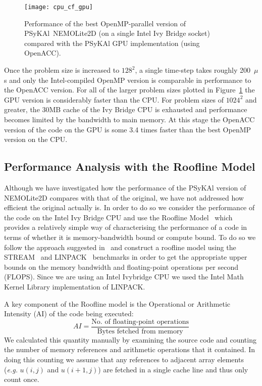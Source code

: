 \documentclass[gmd, manuscript]{copernicus}
\begin{document}
\begin{figure}
\centering
\texttt{[image: cpu\_cf\_gpu]}
\caption{Performance of the best OpenMP-parallel version of {PS}y{KA}l\
  NEMOLite2D (on a single Intel Ivy Bridge socket) compared with the {PS}y{KA}l GPU implementation (using OpenACC).}
\label{FIG_cpu_cf_gpu}
\end{figure}

Once the problem size is increased to $128^2$, a single time-step
takes roughly 200~$\mu$s and only the Intel-compiled OpenMP version is
comparable in performance to the OpenACC version. For all of the
larger problem sizes plotted in Figure~\ref{FIG_cpu_cf_gpu} the GPU
version is considerably faster than the CPU.  For problem sizes of
$1024^2$ and greater, the 30MB cache of the Ivy Bridge CPU is
exhausted and performance becomes limited by the bandwidth to main
memory. At this stage the OpenACC version of the code on the GPU is
some 3.4 times faster than the best OpenMP version on the CPU.


\subsection{Performance Analysis with the Roofline Model}

Although we have investigated how the performance of the {PS}y{KA}l
version of NEMOLite2D compares with that of the original, we have not
addressed how efficient the original actually is. In order to do so we
consider the performance of the code on the Intel Ivy Bridge CPU and
use the Roofline Model~\citep{roofline} which provides a relatively
simple way of characterising the performance of a code in terms of
whether it is memory-bandwidth bound or compute bound. To do so we
follow the approach suggested in~\cite{para_pearls} and construct a
roofline model using the STREAM~\citep{stream} and
LINPACK~\citep{linpack} benchmarks in order to get the appropriate
upper bounds on the memory bandwidth and floating-point operations per
second (FLOPS). Since we are using an Intel Ivybridge CPU we used the
Intel Math Kernel Library implementation of LINPACK.

A key component of the Roofline model is the Operational or Arithmetic
Intensity (AI) of the code being executed:
\[
AI = \frac{\textrm{No. of floating-point operations}}{\textrm{Bytes fetched from memory}}
\]
We calculated this quantity manually by examining the
source code and counting the number of memory references and
arithmetic operations that it contained. In doing this counting we
assume that any references to adjacent array elements (\textit{e.g.}
$u(i,j)$ and $u(i+1,j)$) are fetched in a single cache line and thus
only count once.
\end{document}
